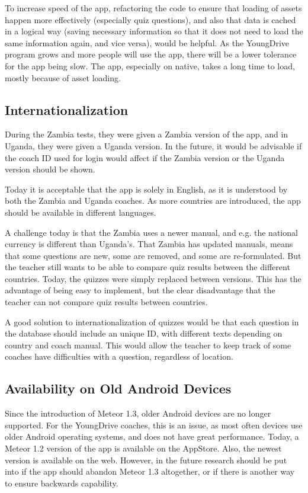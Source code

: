To increase speed of the app, refactoring the code to ensure that loading of assets happen more effectively (especially quiz questions), and also that data is cached in a logical way (saving necessary information so that it does not need to load the same information again, and vice versa), would be helpful. As the YoungDrive program grows and more people will use the app, there will be a lower tolerance for the app being slow. The app, especially on native, takes a long time to load, mostly because of asset loading.

\subsection{Internationalization}\label{sec:internationalization}
During the Zambia tests, they were given a Zambia version of the app, and in Uganda, they were given a Uganda version. In the future, it would be advisable if the coach ID used for login would affect if the Zambia version or the Uganda version should be shown.

Today it is acceptable that the app is solely in English, as it is understood by both the Zambia and Uganda coaches. As more countries are introduced, the app should be available in different languages.

A challenge today is that the Zambia uses a newer manual, and e.g. the national currency is different than Uganda's. That Zambia has updated manuals, means that some questions are new, some are removed, and some are re-formulated. But the teacher still wants to be able to compare quiz results between the different countries. Today, the quizzes were simply replaced between versions. This has the advantage of being easy to implement, but the clear disadvantage that the teacher can not compare quiz results between countries.

A good solution to internationalization of quizzes would be that each question in the database should include an unique ID, with different texts depending on country and coach manual. This would allow the teacher to keep track of some coaches have difficulties with a question, regardless of location.

\subsection{Availability on Old Android Devices}
Since the introduction of Meteor 1.3, older Android devices are no longer supported. For the YoungDrive coaches, this is an issue, as most often devices use older Android operating systems, and does not have great performance. Today, a Meteor 1.2 version of the app is available on the AppStore. Also, the newest version is available on the web. However, in the future research should be put into if the app should abandon Meteor 1.3 altogether, or if there is another way to ensure backwards capability.

